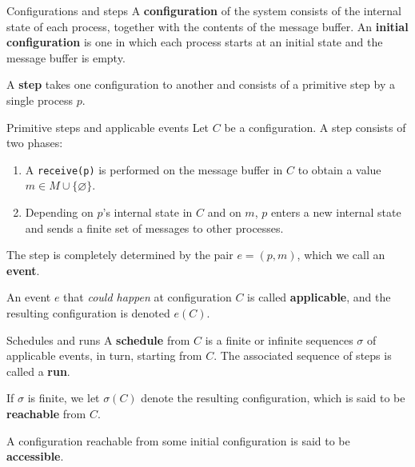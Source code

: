\documentclass[12pt]{beamer}
\begin{document}
  \begin{frame}{Configurations and steps}
    A \textbf{configuration} of the system consists of the internal state of
    each process, together with the contents of the message buffer. An
    \textbf{initial configuration} is one in which each process starts at an
    initial state and the message buffer is empty.

    \vspace{0.5cm}

    A \textbf{step} takes one configuration to another and consists of a
    primitive step by a single process \(p\).
  \end{frame}

  \begin{frame}{Primitive steps and applicable events}
    Let \(C\) be a configuration. A step consists of two phases:
    \begin{enumerate}
      \item A \texttt{receive(p)} is performed on the message buffer in \(C\)
        to obtain a value \(m\in M\cup\{\varnothing\}\).
      \item Depending on \(p\)'s internal state in \(C\) and on \(m\), \(p\)
        enters a new internal state and sends a finite set of messages to other
        processes.
    \end{enumerate}

    \vspace{0.25cm}

    The step is completely determined by the pair \(e = (p,m)\), which we call
    an \textbf{event}.

    \vspace{0.25cm}

    An event \(e\) that \emph{could happen} at configuration \(C\) is called
    \textbf{applicable}, and the resulting configuration is denoted \(e(C)\).
  \end{frame}

  \begin{frame}{Schedules and runs}
    A \textbf{schedule} from \(C\) is a finite or infinite sequences \(\sigma\)
    of applicable events, in turn, starting from \(C\). The associated sequence
    of steps is called a \textbf{run}.

    \vspace{0.25cm}

    If \(\sigma\) is finite, we let \(\sigma(C)\) denote the resulting
    configuration, which is said to be \textbf{reachable} from \(C\).

    \vspace{0.25cm}

    A configuration reachable from some initial configuration is said to be
    \textbf{accessible}.
  \end{frame}
\end{document}
